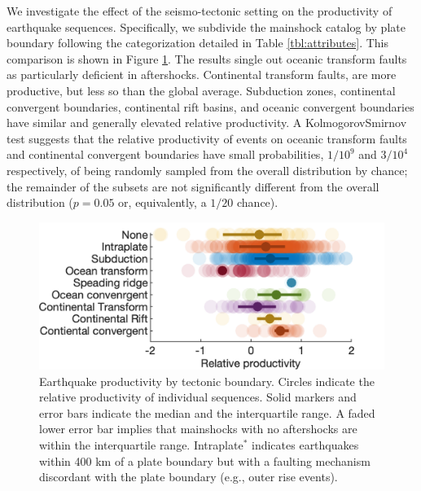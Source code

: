 \documentclass[draft, jgrga]{agujournal2018}
\begin{document}
    We investigate the effect of the seismo-tectonic setting on the productivity of earthquake sequences. Specifically, we subdivide the mainshock catalog by plate boundary following the categorization detailed in Table \ref{tbl:attributes}. This comparison is shown in Figure \ref{fig:plate_boundary}. The results single out oceanic transform faults as particularly deficient in aftershocks. Continental transform faults, are more productive, but less so than the global average. Subduction zones, continental convergent boundaries, continental rift basins, and oceanic convergent boundaries have similar and generally elevated relative productivity. A  Kolmogorov\-Smirnov test  suggests that the relative productivity of events on oceanic transform faults and continental convergent boundaries have small probabilities, $1/10^9$ and $3/10^4$ respectively, of being randomly sampled from the overall distribution by chance; the remainder of the subsets are not significantly different from the overall distribution ($p = 0.05$ or, equivalently, a  $1/20$ chance).

    \begin{figure}
        \centering
        \includegraphics{prod_by_pb.png}
        \caption{Earthquake productivity by tectonic boundary. Circles indicate the relative productivity of individual sequences. Solid markers and error bars indicate the median and the interquartile range. A faded lower error bar implies that mainshocks with no aftershocks are within the interquartile range. Intraplate$^*$ indicates earthquakes within 400 km of a plate boundary but with a faulting mechanism discordant with the plate boundary (e.g., outer rise events).}
        \label{fig:plate_boundary}
    \end{figure}
\end{document}
